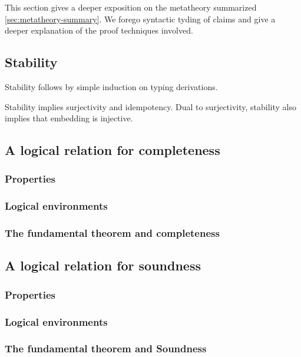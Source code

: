 \documentclass[authoryear, acmsmall, screen, review, nonacm]{acmart} %
\begin{document}
This section gives a deeper exposition on the metatheory summarized \cref{sec:metatheory-summary}. We forego syntactic tyding of claims and give a deeper explanation of the proof techniques involved.

\subsection{Stability}

Stability follows by simple induction on typing derivations. 

\begin{theorem}[stability]
\end{theorem}

Stability implies surjectivity and idempotency.
Dual to surjectivity, stability also implies that embedding is injective.

\subsection{A logical relation for completeness}

\subsubsection{Properties}

\subsubsection{Logical environments}

\subsubsection{The fundamental theorem and completeness}

\subsection{A logical relation for soundness}

\subsubsection{Properties}

\subsubsection{Logical environments}

\subsubsection{The fundamental theorem and Soundness}



\end{document}
